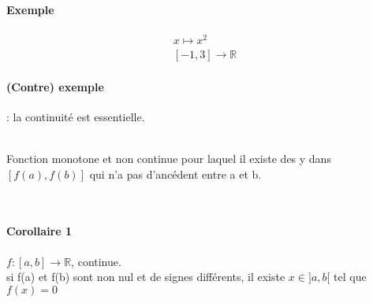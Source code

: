 \paragraph{Exemple} \begin{align*}
	x \mapsto x^2\\
	[-1, 3] \rightarrow \mathbb{R}
\end{align*}

\newpage
\paragraph{(Contre) exemple} : la continuité est essentielle. 
~\\
~\\
Fonction monotone et non continue pour laquel il existe des y dans $[f(a), f(b)]$ qui n'a pas d'ancédent entre a et b.

~\\

\paragraph{Corollaire 1} $f:[a, b] \rightarrow \mathbb{R}$, continue. ~\\
si f(a) et f(b) sont non nul et de signes différents, il existe $x \in ]a, b[$ tel que $f(x) = 0$
